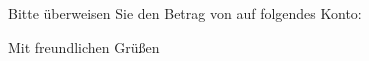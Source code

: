 

\lipsum[1-10]

Bitte überweisen Sie den Betrag von  auf folgendes Konto:

\kto

\closing{Mit freundlichen Grüßen}



